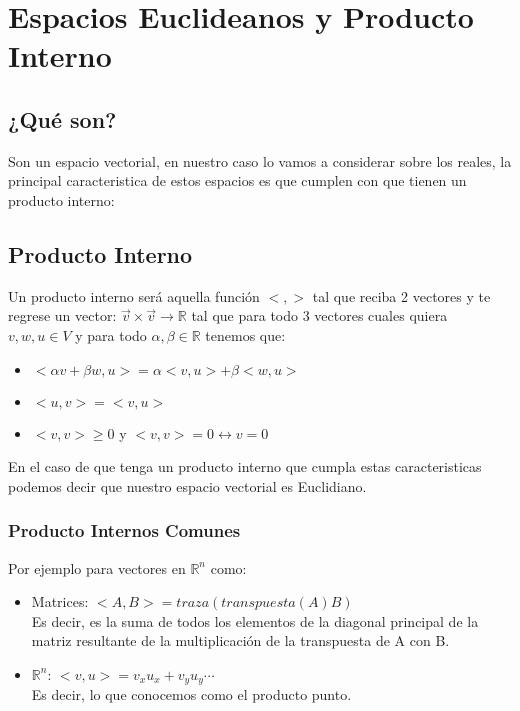 \documentclass[12pt]{article}							    %
\begin{document}
\clearpage
\section{Espacios Euclideanos y Producto Interno}

\subsection{¿Qué son?}
Son un espacio vectorial, en nuestro caso lo vamos a considerar sobre los reales, la principal caracteristica de estos espacios es que cumplen con que tienen un producto interno:


\subsection{Producto Interno}
Un producto interno será aquella función $<,>$ tal que reciba 2 vectores y te regrese un vector: $\vec v \times \vec v \to \mathbb{R}$ tal que para todo 3 vectores cuales quiera $v, w, u \in V$ y para todo $\alpha , \beta \in  \mathbb{R} $ tenemos que:

\begin{itemize}
    \item $<\alpha v + \beta w, u> = \alpha <v, u> + \beta <w, u>$
    \item $<u, v> = <v, u>$
    \item $<v, v> \geq 0 $ y $ <v, v> = 0 \leftrightarrow v = 0$
\end{itemize}

En el caso de que tenga un producto interno que cumpla estas caracteristicas podemos decir que nuestro espacio vectorial es Euclidiano.

\subsubsection{Producto Internos Comunes}
Por ejemplo para vectores en $\mathbb{R}^n$ como:

\begin{itemize}
    \item Matrices: $<A, B> = traza( transpuesta(A)B)$ \\ Es decir, es la suma de todos los elementos de la diagonal
    principal de la matriz resultante de la multiplicación de la transpuesta de A con B.

    \item $\mathbb{R}^n$: $<v, u> = v_x u_x + v_y u_y \cdots$ \\ Es decir, lo que conocemos como el producto punto. 
\end{itemize}
\end{document}
